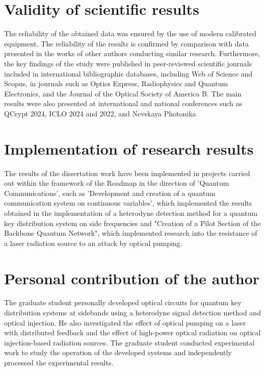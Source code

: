 \section*{Validity of scientific results}
The reliability of the obtained data was ensured by the use of modern calibrated equipment. The reliability of the results is confirmed by comparison with data presented in the works of other authors conducting similar research.
Furthermore, the key findings of the study were published in peer-reviewed scientific journals included in international bibliographic databases, including Web of Science and Scopus, in journals such as Optics Express, Radiophysics and Quantum Electronics, and the Journal of the Optical Society of America B. The main results were also presented at international and national conferences such as QCrypt 2024, ICLO 2024 and 2022, and Nevskaya Photonika
\section*{Implementation of research results}
The results of the dissertation work have been implemented in projects carried out within the framework of the Roadmap in the direction of 'Quantum Communications', such as 'Development and creation of a quantum communication system on continuous variables', which implemented the results obtained in the implementation of a heterodyne detection method for a quantum key distribution system on side frequencies and "Creation of a Pilot Section of the Backbone Quantum Network", which implemented research into the resistance of a laser radiation source to an attack by optical pumping.

\section*{Personal contribution of the author}
The graduate student personally developed optical circuits for quantum key distribution systems at sidebands using a heterodyne signal detection method and optical injection. He also investigated the effect of optical pumping on a laser with distributed feedback and the effect of high-power optical radiation on optical injection-based radiation sources. The graduate student conducted experimental work to study the operation of the developed systems and independently processed the experimental results.

